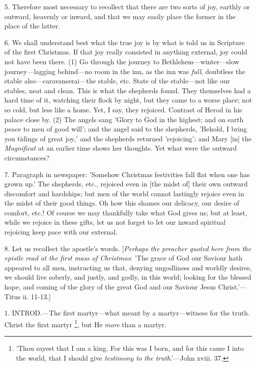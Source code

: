 5. Therefore most necessary to recollect that
there are two sorts of joy, earthly or outward, heavenly or inward,
and that we may easily place the former in the place of the latter.

6. We shall understand best what the true joy is
by what is told us in Scripture of the first Christmas. If that joy
really consisted in anything external, joy could not have been there.
(1) Go through the journey to Bethlehem—winter—slow
journey—lagging behind—no room in the inn, as the inn was \emph{full},
doubtless the stable also—caravanserai—the stable, etc. State of
the stable—not like our stables, neat and clean. This is what the
shepherds found. They themselves had a hard time of it, watching their
flock by night, but they came to a worse place; not so cold, but less
like a home. Yet, I say, they rejoiced. Contrast of Herod in his
palace close by. (2) The angels sang 'Glory to God in the highest; and
on earth peace to men of good will'; and the angel said to the
shepherds, 'Behold, I bring you tidings of great joy,' and the
shepherds returned 'rejoicing': and Mary [in] the \emph{Magnificat} at
an earlier time shows her thoughts. Yet what were the outward
circumstances?

7. Paragraph in newspaper: 'Somehow Christmas
festivities fall flat when one has grown up.' The shepherds, etc.,
rejoiced even in [the midst of] their own outward discomfort and
hardships; but men of the world cannot lastingly rejoice even in the
midst of their good things. Oh how this shames our delicacy, our
desire of comfort, etc.! Of course we may thankfully take what God
gives us; but at least, while we rejoice in these gifts, let us not
forget to let our inward spiritual rejoicing keep pace with our
external.

8. Let us recollect the apostle's words. [\emph{Perhaps
the preacher quoted here from the epistle read at the first mass of
Christmas}: 'The grace of God our Saviour hath appeared to all men,
instructing us that, denying ungodliness and worldly desires, we
should live soberly, and justly, and godly, in this world; looking for
the blessed hope, and coming of the glory of the great God and our
Saviour Jesus Christ.'—Titus ii. 11-13.]


1. INTROD.—The
first martyr—what meant by a martyr—witness for the truth. Christ
the first martyr \footnote{'Thou sayest that I am a
king. For this was I born, and for this came I into the world, that I
should give \emph{testimony to the truth}.'—John xviii. 37.}, but He \emph{more}
than a martyr.

